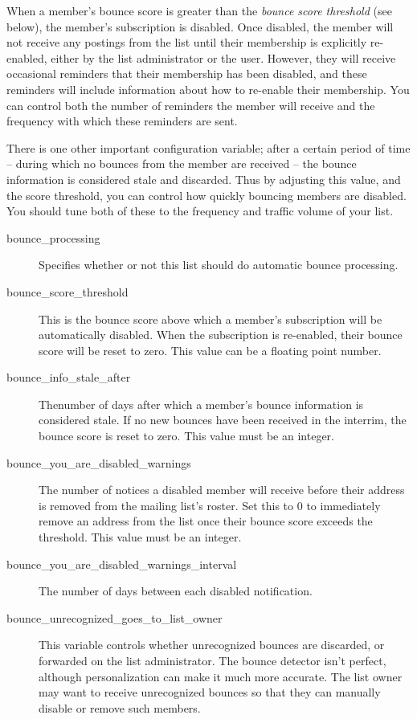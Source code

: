 \documentclass{howto}
\begin{document}
When a member's bounce score is greater than the \emph{bounce score
threshold} (see below), the member's subscription is disabled.  Once
disabled, the member will not receive any postings from the list until
their membership is explicitly re-enabled, either by the list
administrator or the user.  However, they will receive occasional
reminders that their membership has been disabled, and these reminders
will include information about how to re-enable their membership.  You
can control both the number of reminders the member will receive and
the frequency with which these reminders are sent.

There is one other important configuration variable; after a certain
period of time -- during which no bounces from the member are received
-- the bounce information is considered stale and discarded.  Thus by
adjusting this value, and the score threshold, you can control how
quickly bouncing members are disabled.  You should tune both of these
to the frequency and traffic volume of your list.

\begin{description}

\item[bounce_processing]
    Specifies whether or not this list should do automatic bounce
    processing.

\item[bounce_score_threshold]
    This is the bounce score above which a member's subscription will
    be automatically disabled.  When the subscription is re-enabled,
    their bounce score will be reset to zero.  This value can be a
    floating point number.

\item[bounce_info_stale_after]
    Thenumber of days after which a member's bounce information is
    considered stale.  If no new bounces have been received in the
    interrim, the bounce score is reset to zero.  This value must be
    an integer.

\item[bounce_you_are_disabled_warnings]
    The number of notices a disabled member will receive before their
    address is removed from the mailing list's roster.  Set this to 0
    to immediately remove an address from the list once their bounce
    score exceeds the threshold.  This value must be an integer.

\item[bounce_you_are_disabled_warnings_interval]
    The number of days between each disabled notification.

\item[bounce_unrecognized_goes_to_list_owner]
    This variable controls whether unrecognized bounces are discarded,
    or forwarded on the list administrator.  The bounce detector isn't
    perfect, although personalization can make it much more accurate.
    The list owner may want to receive unrecognized bounces so that
    they can manually disable or remove such members.
\end{description}
\end{document}
